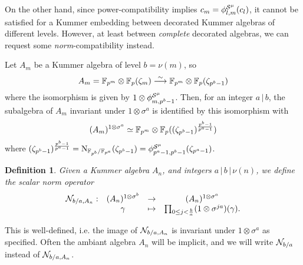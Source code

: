 \documentclass{sig-alternate}
\newtheorem{definition}[theorem]{Definition}
\begin{document}
On the other hand, 
since power-compatibility implies $c_m={\phi^{\mathcal{S}^\mu}_{{l},{m}}}(c_l)$,
it cannot be satisfied for a Kummer embedding
between decorated Kummer algebras of different levels.
However, at least between \emph{complete} decorated algebras, we can request some \emph{norm}-compatibility
instead.

Let $A_m$ be a Kummer algebra of level $b=\nu(m)$, so
\[ A_m=\mathbb{F}_{p^m}\otimes\mathbb{F}_{p}(\zeta_m)\overset{\sim}{\longrightarrow}\mathbb{F}_{p^m}\otimes\mathbb{F}_{p}(\zeta_{p^b-1}) \]
where the isomorphism is given by $1\otimes{\phi^{\mathcal{S}^\mu}_{{m},{p^b-1}}}$.
Then, for an integer $a\,|\,b$,
the subalgebra of $A_m$ invariant under $1\otimes\sigma^a$ is identified
by this isomorphism with
\[ (A_m)^{1\otimes\sigma^a}\simeq\mathbb{F}_{p^m}\otimes\mathbb{F}_{p}((\zeta_{p^b-1})^{\frac{p^b-1}{p^a-1}}) \]
where $(\zeta_{p^b-1})^{\frac{p^b-1}{p^a-1}}=\operatorname{N}_{\mathbb{F}_{p^b}/\mathbb{F}_{p^a}}(\zeta_{p^b-1})={\phi^{\mathcal{S}^\mu}_{{p^a-1},{p^b-1}}}(\zeta_{p^a-1})$.

\begin{definition}
\label{def:norm}
Given a Kummer algebra $A_n$, and integers $a\,|\,b\,|\,\nu(n)$, we define
the \emph{scalar norm} operator
\[
\begin{array}{cccc}
  \mathcal{N}_{b/a,A_n}: & (A_n)^{1\otimes\sigma^b} & \to & (A_n)^{1\otimes\sigma^a} \\
  & \gamma & \mapsto & \prod_{0\leq j<\frac{b}{a}} (1 \otimes \sigma^{ja})(\gamma).
\end{array}
\]
\end{definition}
This is well-defined, i.e. the image of $\mathcal{N}_{b/a,A_n}$ is invariant under $1\otimes\sigma^a$ as specified.
Often the ambiant algebra $A_n$ will be implicit,
and we will write $\mathcal{N}_{b/a}$ instead of $\mathcal{N}_{b/a,A_n}$.
\end{document}
